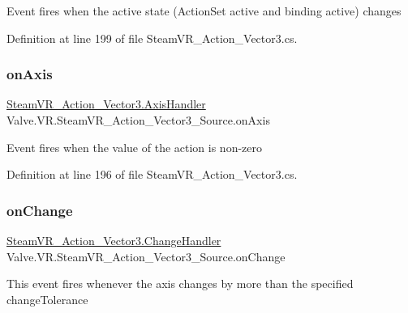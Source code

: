 Event fires when the active state (Action\+Set active and binding active) changes 



Definition at line 199 of file Steam\+V\+R\+\_\+\+Action\+\_\+\+Vector3.\+cs.

\mbox{\label{class_valve_1_1_v_r_1_1_steam_v_r___action___vector3___source_aad31d43b8199ea783c0e93b1feb4038d}} 
\subsubsection{\texorpdfstring{onAxis}{onAxis}}
{\footnotesize\ttfamily \mbox{\hyperlink{class_valve_1_1_v_r_1_1_steam_v_r___action___vector3_a9b135b663b22c421dc36dbc48d2d35b6}{Steam\+V\+R\+\_\+\+Action\+\_\+\+Vector3.\+Axis\+Handler}} Valve.\+V\+R.\+Steam\+V\+R\+\_\+\+Action\+\_\+\+Vector3\+\_\+\+Source.\+on\+Axis}



Event fires when the value of the action is non-\/zero 



Definition at line 196 of file Steam\+V\+R\+\_\+\+Action\+\_\+\+Vector3.\+cs.

\mbox{\label{class_valve_1_1_v_r_1_1_steam_v_r___action___vector3___source_a12522241a76d7e22632bea426fc9da08}} 
\subsubsection{\texorpdfstring{onChange}{onChange}}
{\footnotesize\ttfamily \mbox{\hyperlink{class_valve_1_1_v_r_1_1_steam_v_r___action___vector3_a78943f89733a1c1a8e12cb4896e65907}{Steam\+V\+R\+\_\+\+Action\+\_\+\+Vector3.\+Change\+Handler}} Valve.\+V\+R.\+Steam\+V\+R\+\_\+\+Action\+\_\+\+Vector3\+\_\+\+Source.\+on\+Change}



This event fires whenever the axis changes by more than the specified change\+Tolerance 



